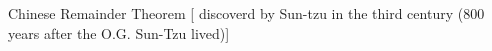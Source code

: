Chinese Remainder Theorem [ discoverd by Sun-tzu in the third century (800 years after the O.G. Sun-Tzu lived)]
